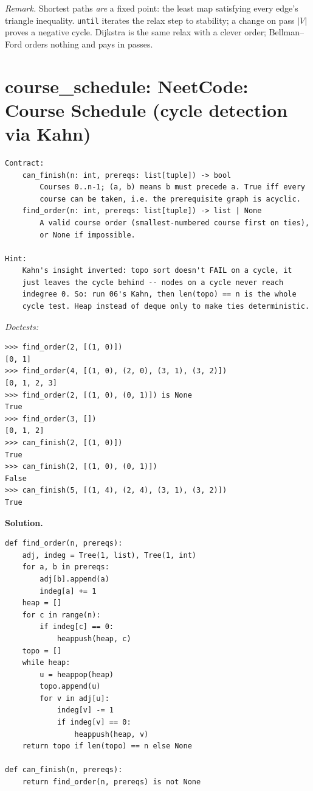 \documentclass[11pt,letterpaper]{book}
\begin{document}
\noindent\textit{Remark.} Shortest paths \emph{are} a fixed point: the least map
satisfying every edge's triangle inequality. \texttt{until} iterates the relax
step to stability; a change on pass $|V|$ proves a negative cycle. Dijkstra is
the same relax with a clever order; Bellman--Ford orders nothing and pays in
passes.

\section{course\_schedule: NeetCode: Course Schedule (cycle detection via Kahn)}
\begin{lstlisting}[style=spec]
Contract:
    can_finish(n: int, prereqs: list[tuple]) -> bool
        Courses 0..n-1; (a, b) means b must precede a. True iff every
        course can be taken, i.e. the prerequisite graph is acyclic.
    find_order(n: int, prereqs: list[tuple]) -> list | None
        A valid course order (smallest-numbered course first on ties),
        or None if impossible.

Hint:
    Kahn's insight inverted: topo sort doesn't FAIL on a cycle, it
    just leaves the cycle behind -- nodes on a cycle never reach
    indegree 0. So: run 06's Kahn, then len(topo) == n is the whole
    cycle test. Heap instead of deque only to make ties deterministic.
\end{lstlisting}
\noindent\textit{Doctests:}
\begin{lstlisting}[style=spec]
>>> find_order(2, [(1, 0)])
[0, 1]
>>> find_order(4, [(1, 0), (2, 0), (3, 1), (3, 2)])
[0, 1, 2, 3]
>>> find_order(2, [(1, 0), (0, 1)]) is None
True
>>> find_order(3, [])
[0, 1, 2]
>>> can_finish(2, [(1, 0)])
True
>>> can_finish(2, [(1, 0), (0, 1)])
False
>>> can_finish(5, [(1, 4), (2, 4), (3, 1), (3, 2)])
True
\end{lstlisting}
\noindent\textbf{Solution.}
\begin{lstlisting}[style=code]
def find_order(n, prereqs):
    adj, indeg = Tree(1, list), Tree(1, int)
    for a, b in prereqs:
        adj[b].append(a)
        indeg[a] += 1
    heap = []
    for c in range(n):
        if indeg[c] == 0:
            heappush(heap, c)
    topo = []
    while heap:
        u = heappop(heap)
        topo.append(u)
        for v in adj[u]:
            indeg[v] -= 1
            if indeg[v] == 0:
                heappush(heap, v)
    return topo if len(topo) == n else None

def can_finish(n, prereqs):
    return find_order(n, prereqs) is not None
\end{lstlisting}
\end{document}
